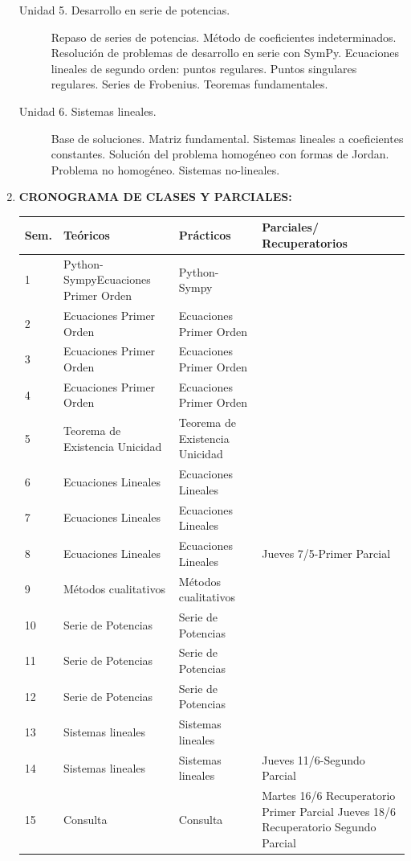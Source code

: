 \documentclass[12pt]{article}
\begin{document}
\begin{enumerate}
\begin{description}
\item[Unidad 5. Desarrollo en serie de potencias.] Repaso de series de potencias. Método de coeficientes indeterminados.  Resolución de problemas de desarrollo en serie con  SymPy.   Ecuaciones lineales de segundo orden: puntos regulares. Puntos singulares regulares. Series de Frobenius. Teoremas fundamentales.\cite{simmons_esp, WilliamE.Boyce496}

\item[Unidad 6.  Sistemas lineales.]  Base de soluciones. Matriz fundamental. Sistemas lineales a coeficientes constantes. Solución del problema homogéneo con formas de Jordan. Problema no homogéneo. Sistemas no-lineales. \cite{ WilliamE.Boyce496,JorgeSotomayor513}

\end{description}

\item\textbf{CRONOGRAMA DE CLASES Y PARCIALES:}

\begin{table}[H]
\begin{tabular}{|m{0.6cm} |m{5cm}|m{5cm}|m{4.8cm}|}\hline
Sem.  & Teóricos & Prácticos & Parciales/ Recuperatorios\\\hline \hline
1   & Python-Sympy\newline Ecuaciones Primer Orden  &  Python-Sympy &   \\ \hline
  2 &  Ecuaciones Primer Orden  & Ecuaciones Primer Orden  &   \\ \hline
  3 &  Ecuaciones Primer Orden    &  Ecuaciones Primer Orden &   \\ \hline
   4 &  Ecuaciones Primer Orden    &  Ecuaciones Primer Orden &   \\ \hline
  5 & Teorema de Existencia Unicidad  &  Teorema de Existencia Unicidad   &   \\ \hline
  6 &   Ecuaciones Lineales   &  Ecuaciones Lineales   &   \\ \hline
  7 &  Ecuaciones Lineales   &  Ecuaciones Lineales &   \\ \hline

  8& Ecuaciones Lineales   &  Ecuaciones Lineales &  Jueves 7/5-Primer Parcial  \\ \hline

  9 & Métodos cualitativos & Métodos cualitativos   &   \\ \hline
  10 & Serie de Potencias  & Serie de Potencias  &   \\ \hline
  11 & Serie de Potencias   & Serie de Potencias  &   \\ \hline
   12 & Serie de Potencias   & Serie de Potencias  &   \\ \hline
  13 & Sistemas lineales  & Sistemas lineales  &   \\ \hline
  14 & Sistemas lineales & Sistemas lineales  &  Jueves 11/6-Segundo Parcial \\ \hline
  15  & Consulta & Consulta &  Martes 16/6 Recuperatorio Primer Parcial\newline
  Jueves 18/6 Recuperatorio Segundo Parcial \\ \hline


\end{tabular}
\end{table}
\end{enumerate}
\end{document}

